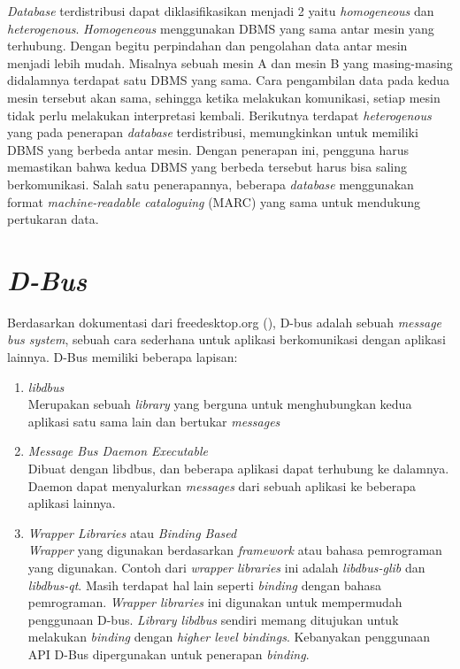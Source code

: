 \emph{Database} terdistribusi dapat diklasifikasikan menjadi 2 yaitu \emph{homogeneous} 
dan \emph{heterogenous}. \emph{Homogeneous} menggunakan DBMS yang sama antar mesin 
yang terhubung. Dengan begitu perpindahan dan pengolahan data antar mesin 
menjadi lebih mudah. Misalnya sebuah mesin A dan mesin B yang masing-masing 
didalamnya terdapat satu DBMS yang sama. Cara pengambilan data pada kedua 
mesin tersebut akan sama, sehingga ketika melakukan komunikasi, setiap 
mesin tidak perlu melakukan interpretasi kembali. Berikutnya terdapat 
\emph{heterogenous} yang pada penerapan \emph{database} terdistribusi, memungkinkan 
untuk memiliki DBMS yang berbeda antar mesin. Dengan penerapan ini, pengguna 
harus memastikan bahwa kedua DBMS yang berbeda tersebut harus bisa saling 
berkomunikasi. Salah satu penerapannya, beberapa \emph{database} menggunakan 
format \emph{machine-readable cataloguing} (MARC) yang sama untuk mendukung 
pertukaran data. 


\section{\emph{D-Bus}}
Berdasarkan dokumentasi dari freedesktop.org (\cite{dbus}), D-bus adalah 
sebuah \emph{message bus system}, sebuah cara sederhana untuk aplikasi 
berkomunikasi dengan aplikasi lainnya. D-Bus memiliki beberapa lapisan:

\begin{enumerate}
	\item \emph{libdbus} \\
  Merupakan sebuah \emph{library} yang berguna untuk menghubungkan kedua aplikasi satu sama lain dan bertukar \emph{messages}
  
	\item \emph{Message Bus Daemon Executable} \\
  Dibuat dengan libdbus, dan beberapa aplikasi dapat terhubung ke dalamnya. Daemon dapat menyalurkan \emph{messages} dari sebuah aplikasi ke beberapa aplikasi lainnya.

	\item \emph{Wrapper Libraries} atau \emph{Binding Based} \\
	\emph{Wrapper} yang digunakan berdasarkan \emph{framework} atau bahasa pemrograman yang digunakan. Contoh dari \emph{wrapper libraries} ini adalah
  \emph{libdbus-glib} dan \emph{libdbus-qt}. Masih terdapat hal lain seperti \emph{binding} dengan bahasa pemrograman. \emph{Wrapper libraries} ini digunakan untuk 
  mempermudah penggunaan D-bus. \emph{Library libdbus} sendiri memang ditujukan untuk melakukan \emph{binding} dengan \emph{higher level bindings}. Kebanyakan penggunaan API D-Bus
  dipergunakan untuk penerapan \emph{binding}.   
\end{enumerate}

